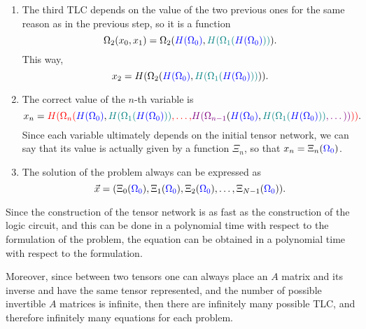 \begin{enumerate}
    \item The third TLC depends on the value of the two previous ones for the same reason as in the previous step, so it is a function
    \begin{equation}
    \Omega_2(x_0,x_1)=\Omega_2({\color{blue} H(\Omega_0)},{\color{teal} H(\Omega_1(}{\color{blue} H(\Omega_0)}{\color{teal} ))}).
    \end{equation}
    This way,
    \begin{equation}
        x_2 = H(\Omega_2({\color{blue} H(\Omega_0)},{\color{teal} H(\Omega_1(}{\color{blue} H(\Omega_0)}{\color{teal} ))})).
    \end{equation}

    \item The correct value of the $n$-th variable is
    \begin{equation}
        x_n = {\color{red}H( \Omega_n(}{\color{blue} H(\Omega_0)},{\color{teal} H(\Omega_1(}{\color{blue} H(\Omega_0)}{\color{teal} ))}{\color{red},\dots,}{\color{violet} H(\Omega_{n-1}}({\color{blue} H(\Omega_0)},{\color{teal} H(\Omega_1(}{\color{blue} H(\Omega_0)}{\color{teal} ))}{\color{violet},\dots ))}{\color{red} ))}.
    \end{equation}
    Since each variable ultimately depends on the initial tensor network, we can say that its value is actually given by a function $\Xi_n$, so that $x_n=\Xi_n({\color{blue}\Omega_0})$.
    \item The solution of the problem always can be expressed as
    \begin{equation}
        \vec{x}=(\Xi_0({\color{blue}\Omega_0}), \Xi_1({\color{blue}\Omega_0}), \Xi_2({\color{blue}\Omega_0}),\dots, \Xi_{N-1}({\color{blue}\Omega_0})).
    \end{equation}
\end{enumerate}

Since the construction of the tensor network is as fast as the construction of the logic circuit, and this can be done in a polynomial time with respect to the formulation of the problem, the equation can be obtained in a polynomial time with respect to the formulation.

Moreover, since between two tensors one can always place an $A$ matrix and its inverse and have the same tensor represented, and the number of possible invertible $A$ matrices is infinite, then there are infinitely many possible TLC, and therefore infinitely many equations for each problem.


